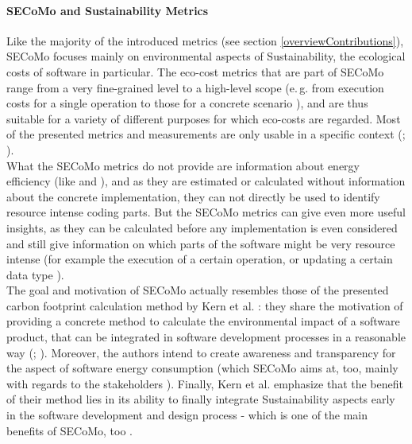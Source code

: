 \documentclass[oribibl]{llncs}
\begin{document}
\paragraph{SECoMo and Sustainability Metrics}
Like the majority of the introduced metrics (see section \ref{overviewContributions}), SECoMo focuses mainly on environmental aspects of Sustainability, the ecological costs of software in particular. The eco-cost metrics that are part of SECoMo range from a very fine-grained level to a high-level scope (e.\,g. from execution costs for a single operation to those for a concrete scenario \cite{schulze_cost_2016}), and are thus suitable for a variety of different purposes for which eco-costs are regarded. Most of the presented metrics and measurements are only usable in a specific context (\cite{naumann_how_2008}; \cite{capra_is_2012}).\\ %
What the SECoMo metrics do not provide are information about energy efficiency (like \cite{capra_is_2012} and \cite{johann_how_2012}), and as they are estimated or calculated without information about the concrete implementation, they can not directly be used to identify resource intense coding parts. But the SECoMo metrics can give even more useful insights, as they can be calculated before any implementation is even considered and still give information on which parts of the software might be very resource intense (for example the execution of a certain operation, or updating a certain data type \cite{schulze_cost_2016}).\\
The goal and motivation of SECoMo actually resembles those of the presented carbon footprint calculation method by Kern et al. \cite{kern_impacts_2015}: they share the motivation of providing a concrete method to calculate the environmental impact of a software product, that can be integrated in software development processes in a reasonable way %
(\cite{kern_impacts_2015}; \cite{schulze_cost_2016}). Moreover, the authors intend to create awareness and transparency for the aspect of software energy consumption \cite{kern_impacts_2015} (which SECoMo aims at, too, mainly with regards to the stakeholders \cite{schulze_cost_2016}). Finally, Kern et al. emphasize that the benefit of their method lies in its ability to finally integrate Sustainability aspects early in the software development and design process %
\cite{kern_impacts_2015} - which is one of the main benefits of SECoMo, too \cite{schulze_cost_2016}.\\ %
\end{document}
